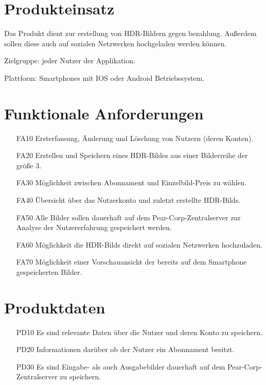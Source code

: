 \documentclass[parskip=full]{scrartcl}
\begin{document}
\section{Produkteinsatz}
Das Produkt dient zur erstellung von HDR-Bildern gegen bezahlung. Außerdem sollen diese auch auf sozialen Netzwerken hochgeladen werden können.

Zielgruppe: jeder Nutzer der Applikation.

Plattform: Smartphones mit IOS oder Android Betriebssystem.

\section{Funktionale Anforderungen}
\begin{itemize}[nosep]
\item[FA10] Ersterfassung, Änderung und Löschung von Nutzern (deren Konten).
\item[FA20] Erstellen und Speichern eines HDR-Bildes aus einer Bilderreihe der größe 3.
\item[FA30] Möglichkeit zwischen \gls{Abonnament} und Einzelbild-Preis zu wählen.
\item[FA40] Übersicht über das Nutzerkonto und zuletzt erstellte \glspl{HDR-Bild}.
\item[FA50] Alle Bilder sollen dauerhaft auf dem Pear-Corp-Zentralserver zur Analyse der Nutzererfahrung gespeichert werden.
\item[FA60] Möglichkeit die \glspl{HDR-Bild} direkt auf sozialen Netzwerken hochzuladen.
\item[FA70] Möglichkeit einer Vorschauansicht der bereits auf dem \gls{Smartphone} gespeicherten Bilder.
\end{itemize}

\section{Produktdaten}
\begin{itemize}[nosep]
\item[PD10] Es sind relevante Daten über die \gls{Nutzer} und deren Konto zu speichern.
\item[PD20] Informationen darüber ob der Nutzer ein Abonnament besitzt.
\item[PD30] Es sind Eingabe- als auch Ausgabebilder dauerhaft auf dem Pear-Corp-Zentralserver zu speichern.
\end{itemize}
\end{document}
